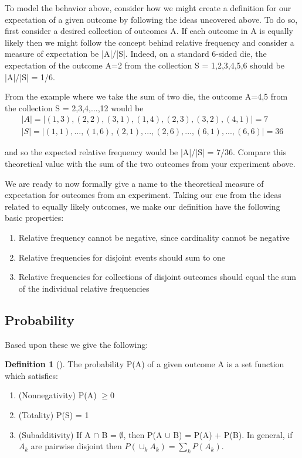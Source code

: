 \documentclass[10pt,]{book}
\theoremstyle{plain}
\theoremstyle{definition}
\newtheorem{definition}[theorem]{Definition}
\theoremstyle{definition}
\numberwithin{equation}{section}
\begin{document}
	To model the behavior above, consider how we might create a definition for our expectation
	of a given outcome by following the ideas uncovered above. To do so, first consider a desired collection
	of outcomes A. If each outcome in A is equally likely then we might follow the concept behind relative 
	frequency and consider a measure of expectation be |A|/|S|. Indeed, on a standard 
	6-sided die, the expectation of the outcome A={2} from the collection S = {1,2,3,4,5,6} should be
	|A|/|S| = 1/6.%
\par
From the example where we take the sum of two die, the outcome A={4,5} from the
	collection S = {2,3,4,...,12} would be%
\begin{gather*}
|A| = | {(1,3),(2,2),(3,1),(1,4),(2,3),(3,2),(4,1)}| = 7\\
|S| = | {(1,1),...,(1,6),(2,1),...,(2,6),...,(6,1),...,(6,6)}| = 36
\end{gather*}\par
and so the expected relative frequency would be |A|/|S| = 7/36. Compare this theoretical value
	with the sum of the two outcomes from your experiment above.%
\par
We are ready to now formally give a name to the theoretical measure of expectation for
	outcomes from an experiment. Taking our cue from the ideas related to equally likely outcomes, we 
	make our definition have the following basic properties:%
\leavevmode%
\begin{enumerate}
\item\hypertarget{li-94}{}Relative frequency cannot be negative, since cardinality cannot be negative%
\item\hypertarget{li-95}{}Relative frequencies for disjoint events should sum to one%
\item\hypertarget{li-96}{}Relative frequencies for collections of disjoint outcomes should equal the sum of the
	individual relative frequencies%
\end{enumerate}
\typeout{************************************************}
\typeout{************************************************}
\subsection[Probability]{Probability}\label{subsection-9}
Based upon these we give the following:%
\begin{definition}[]\label{DefnProb}
The probability P(A) of a given outcome A is a set function which satisfies:
		\leavevmode%
\begin{enumerate}
\item\hypertarget{li-97}{}(Nonnegativity) P(A) \(\ge 0\)%
\item\hypertarget{li-98}{}(Totality) P(S) = 1%
\item\hypertarget{li-99}{}(Subadditivity) If A \(\cap\) B = \(\emptyset\), then P(A \(\cup\) B) = P(A) + P(B).  
			In general, if {\(A_k\)} are pairwise disjoint then \(P( \cup_k A_k) = \sum_k P(A_k)\).%
\end{enumerate}
\end{definition}
\typeout{************************************************}
\typeout{************************************************}
\end{document}
